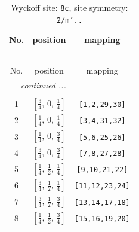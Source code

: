 \documentclass[fleqn,8pt]{jsarticle}
\begin{document}
\renewcommand{\arraystretch}{1.2}
\begin{longtable}{ccc}
\caption{Wyckoff site: {\tt 8c}, site symmetry: {\tt 2/m'..}}
 \\
 \hline \hline
No. & position & mapping \\ \hline \endfirsthead

\multicolumn{2}{l}{\tablename\ \thetable{}} \\
 \hline \hline
No. & position & mapping \\ \hline \endhead

 \hline \hline
\multicolumn{2}{r}{\footnotesize\it continued ...} \\ \endfoot

 \hline \hline
\multicolumn{2}{r}{} \\ \endlastfoot

1 & $\left[ \frac{3}{4},\, 0,\, \frac{1}{4} \right]$ & {\tt [1,2,29,30]} \\ \hline
2 & $\left[ \frac{1}{4},\, 0,\, \frac{1}{4} \right]$ & {\tt [3,4,31,32]} \\ \hline
3 & $\left[ \frac{1}{4},\, 0,\, \frac{3}{4} \right]$ & {\tt [5,6,25,26]} \\ \hline
4 & $\left[ \frac{3}{4},\, 0,\, \frac{3}{4} \right]$ & {\tt [7,8,27,28]} \\ \hline
5 & $\left[ \frac{1}{4},\, \frac{1}{2},\, \frac{1}{4} \right]$ & {\tt [9,10,21,22]} \\ \hline
6 & $\left[ \frac{3}{4},\, \frac{1}{2},\, \frac{1}{4} \right]$ & {\tt [11,12,23,24]} \\ \hline
7 & $\left[ \frac{3}{4},\, \frac{1}{2},\, \frac{3}{4} \right]$ & {\tt [13,14,17,18]} \\ \hline
8 & $\left[ \frac{1}{4},\, \frac{1}{2},\, \frac{3}{4} \right]$ & {\tt [15,16,19,20]} \\
\end{longtable}
\renewcommand{\arraystretch}{1.2}
\end{document}

